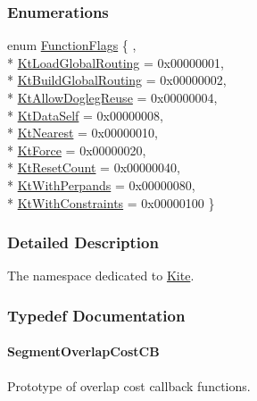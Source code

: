 \subsubsection*{Enumerations}
\begin{DoxyCompactItemize}
\item 
enum \hyperlink{namespaceKite_acca8fffa3182dea5f94208f454f14b47}{Function\-Flags} \{ , \\*
\hyperlink{namespaceKite_acca8fffa3182dea5f94208f454f14b47abd49be7700e04e255b30a6cee68535fd}{Kt\-Load\-Global\-Routing} = 0x00000001, 
\\*
\hyperlink{namespaceKite_acca8fffa3182dea5f94208f454f14b47a0441a09d569a7634f9d1826fa315ddcc}{Kt\-Build\-Global\-Routing} = 0x00000002, 
\\*
\hyperlink{namespaceKite_acca8fffa3182dea5f94208f454f14b47a766f453d6caa06490196a952762f0bb8}{Kt\-Allow\-Dogleg\-Reuse} = 0x00000004, 
\\*
\hyperlink{namespaceKite_acca8fffa3182dea5f94208f454f14b47a68e917ff37d4b5cef906303181836404}{Kt\-Data\-Self} = 0x00000008, 
\\*
\hyperlink{namespaceKite_acca8fffa3182dea5f94208f454f14b47afaf04b2ddbae58557683c20373c0bada}{Kt\-Nearest} = 0x00000010, 
\\*
\hyperlink{namespaceKite_acca8fffa3182dea5f94208f454f14b47a5d7da665ec1368b29ee9d3e382cd1072}{Kt\-Force} = 0x00000020, 
\\*
\hyperlink{namespaceKite_acca8fffa3182dea5f94208f454f14b47aeb3b2254e460ac48ce9a57965ba3627b}{Kt\-Reset\-Count} = 0x00000040, 
\\*
\hyperlink{namespaceKite_acca8fffa3182dea5f94208f454f14b47a8f9c41816abe8ac1da87d930bc12ed5e}{Kt\-With\-Perpands} = 0x00000080, 
\\*
\hyperlink{namespaceKite_acca8fffa3182dea5f94208f454f14b47abffa3499a9376f3e9f1de1ab6b8ba37b}{Kt\-With\-Constraints} = 0x00000100
 \}
\end{DoxyCompactItemize}


\subsubsection{Detailed Description}
The namespace dedicated to \hyperlink{namespaceKite}{Kite}. 

\subsubsection{Typedef Documentation}
\hypertarget{namespaceKite_aa5bc3df660243357cdf8639f57d4a41b}{
\paragraph[{Segment\-Overlap\-Cost\-C\-B}]{\setlength{\rightskip}{0pt plus 5cm}Segment\-Overlap\-Cost\-C\-B}}\label{namespaceKite_aa5bc3df660243357cdf8639f57d4a41b}
Prototype of overlap cost callback functions.

